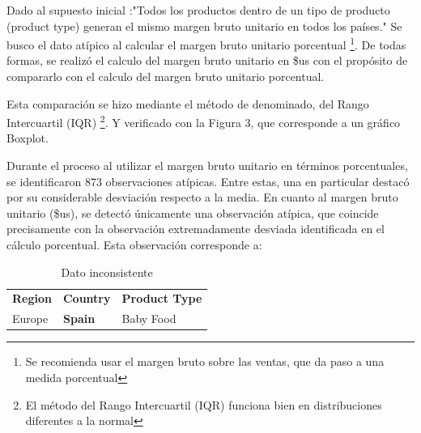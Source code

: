 \documentclass[10pt]{article}
\begin{document}
\begin{paracol}{2}
\switchcolumn[0]\noindent
Dado al supuesto inicial :"Todos los productos dentro de un tipo de producto (product type) generan el mismo margen bruto unitario en todos los países." Se busco el dato atípico al calcular el margen bruto unitario porcentual \footnote{Se recomienda usar el margen bruto sobre las ventas, que da paso a una medida porcentual}. De todas formas, se realizó el calculo del margen bruto unitario en \$us con el propósito de compararlo con el calculo del margen bruto unitario porcentual.

Esta comparación se hizo mediante el método de \cite{tukey1949} denominado, del Rango Intercuartil (IQR)  \footnote{El método del Rango Intercuartil (IQR) funciona bien en distribuciones diferentes a la normal}. Y verificado con la Figura 3, que corresponde a un gráfico Boxplot.

Durante el proceso al utilizar el margen bruto unitario en términos porcentuales, se identificaron 873 observaciones atípicas. Entre estas, una en particular destacó por su considerable desviación respecto a la media. En cuanto al margen bruto unitario (\$us), se detectó únicamente una observación atípica, que coincide precisamente con la observación extremadamente desviada identificada en el cálculo porcentual. Esta observación corresponde a:
\begin{table}[h]
\centering
\begin{tabular}{|l|l|l|}
\hline
\textbf{Region} & \textbf{Country} & \textbf{Product Type} \\
    Europe & \textbf{Spain} & Baby Food \\
\hline
\end{tabular}
\caption{Dato inconsistente}
\end{table}



\end{paracol}
\end{document}
